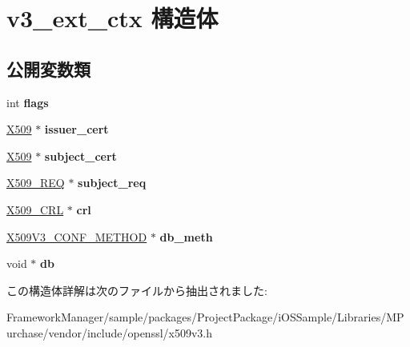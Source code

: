 \hypertarget{structv3__ext__ctx}{}\section{v3\+\_\+ext\+\_\+ctx 構造体}
\label{structv3__ext__ctx}
\subsection*{公開変数類}
\begin{DoxyCompactItemize}
\item 
\hypertarget{structv3__ext__ctx_aef13996482523a866443b3160db73291}{}int {\bfseries flags}\label{structv3__ext__ctx_aef13996482523a866443b3160db73291}

\item 
\hypertarget{structv3__ext__ctx_a727f0302b59312053fdcbd09a195cf85}{}\hyperlink{structx509__st}{X509} $\ast$ {\bfseries issuer\+\_\+cert}\label{structv3__ext__ctx_a727f0302b59312053fdcbd09a195cf85}

\item 
\hypertarget{structv3__ext__ctx_ab93937a6f72e09c41303ebe54c6aa6be}{}\hyperlink{structx509__st}{X509} $\ast$ {\bfseries subject\+\_\+cert}\label{structv3__ext__ctx_ab93937a6f72e09c41303ebe54c6aa6be}

\item 
\hypertarget{structv3__ext__ctx_a2c538c77545078ac3834d7ec19baa2e1}{}\hyperlink{struct_x509__req__st}{X509\+\_\+\+R\+E\+Q} $\ast$ {\bfseries subject\+\_\+req}\label{structv3__ext__ctx_a2c538c77545078ac3834d7ec19baa2e1}

\item 
\hypertarget{structv3__ext__ctx_a01c6e9a776b48effe171dccb3f5ba653}{}\hyperlink{struct_x509__crl__st}{X509\+\_\+\+C\+R\+L} $\ast$ {\bfseries crl}\label{structv3__ext__ctx_a01c6e9a776b48effe171dccb3f5ba653}

\item 
\hypertarget{structv3__ext__ctx_a7e8b728812e1ae2216de8991faeae558}{}\hyperlink{struct_x509_v3___c_o_n_f___m_e_t_h_o_d__st}{X509\+V3\+\_\+\+C\+O\+N\+F\+\_\+\+M\+E\+T\+H\+O\+D} $\ast$ {\bfseries db\+\_\+meth}\label{structv3__ext__ctx_a7e8b728812e1ae2216de8991faeae558}

\item 
\hypertarget{structv3__ext__ctx_ab9c02945f7b4566735f6184baf63b765}{}void $\ast$ {\bfseries db}\label{structv3__ext__ctx_ab9c02945f7b4566735f6184baf63b765}

\end{DoxyCompactItemize}


この構造体詳解は次のファイルから抽出されました\+:\begin{DoxyCompactItemize}
\item 
Framework\+Manager/sample/packages/\+Project\+Package/i\+O\+S\+Sample/\+Libraries/\+M\+Purchase/vendor/include/openssl/x509v3.\+h\end{DoxyCompactItemize}

